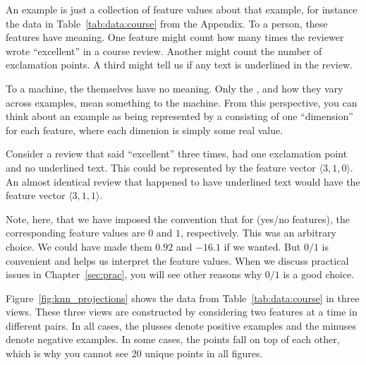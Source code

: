 An example is just a collection of feature values about that example,
for instance the data in Table~\ref{tab:data:course} from the Appendix.
To a person, these features have meaning.  One feature might count how
many times the reviewer wrote ``excellent'' in a course review.
Another might count the number of exclamation points.  A third might
tell us if any text is underlined in the review.

To a machine, the  themselves have no meaning.  Only
the , and how they vary across examples, mean
something to the machine.  From this perspective, you can think about
an example as being represented by a 
consisting of one ``dimension'' for each feature, where each dimenion
is simply some real value.

Consider a review that said ``excellent'' three times, had one
exclamation point and no underlined text.  This could be represented
by the feature vector $\langle 3, 1, 0 \rangle$.  An almost identical
review that happened to have underlined text would have the feature
vector $\langle 3,1,1\rangle$.

Note, here, that we have imposed the convention that for
 (yes/no features), the corresponding feature
values are $0$ and $1$, respectively.  This was an arbitrary choice.
We could have made them $0.92$ and $-16.1$ if we wanted.  But $0/1$ is
convenient and helps us interpret the feature values.  When we discuss
practical issues in Chapter~\ref{sec:prac}, you will see other reasons
why $0/1$ is a good choice.


Figure~\ref{fig:knn_projections} shows the data from
Table~\ref{tab:data:course} in three views.  These three views are
constructed by considering two features at a time in different pairs.
In all cases, the plusses denote positive examples and the minuses
denote negative examples.  In some cases, the points fall on top of
each other, which is why you cannot see 20 unique points in all
figures.

